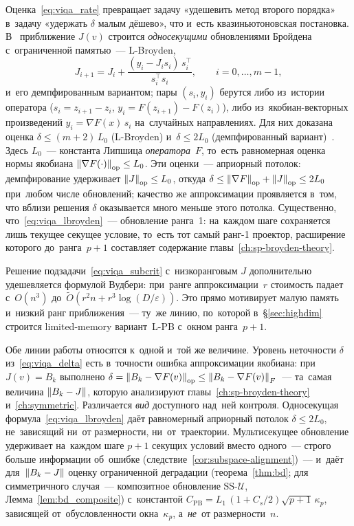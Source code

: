Оценка~\eqref{eq:viqa_rate} превращает задачу «удешевить метод второго
порядка» в~задачу «удержать $\delta$ малым дёшево», что и~есть
квазиньютоновская постановка. В~\cite{viqa2024} приближение $J(v)$
строится \emph{односекущими} обновлениями Бройдена с~ограниченной
памятью~--- L-Broyden,
\begin{equation}\label{eq:viqa_lbroyden}
  J_{i+1} = J_i + \frac{(y_i - J_i s_i)\,s_i^\top}{s_i^\top s_i},
  \qquad i = 0,\dots,m-1,
\end{equation}
и~его демпфированным вариантом; пары $(s_i,y_i)$ берутся либо из~истории
оператора ($s_i=z_{i+1}-z_i$, $y_i=F(z_{i+1})-F(z_i)$), либо из~якобиан-векторных
произведений $y_i=\nabla F(x)\,s_i$ на~случайных направлениях. Для них
доказана оценка $\delta\le(m{+}2)\,L_0$ (L-Broyden) и~$\delta\le 2L_0$
(демпфированный вариант)~\cite{viqa2024}. Здесь $L_0$~--- константа Липшица
\emph{оператора}~$F$, то~есть равномерная оценка нормы якобиана
$\left\|\nabla F(\cdot)\right\|_{\mathrm{op}}\le L_0$. Эти
оценки~--- априорный потолок: демпфирование удерживает
$\left\|J\right\|_{\mathrm{op}}\le L_0$, откуда
$\delta\le\left\|\nabla F\right\|_{\mathrm{op}}+\left\|J\right\|_{\mathrm{op}}\le 2L_0$
при~любом числе обновлений; качество же аппроксимации проявляется в~том,
что вблизи решения $\delta$ оказывается много меньше этого потолка. Существенно, что~\eqref{eq:viqa_lbroyden}~---
обновление ранга~1: на~каждом шаге сохраняется лишь текущее секущее
условие, то~есть тот самый ранг-1 проектор, расширение которого
до~ранга~$p{+}1$ составляет содержание главы~\ref{ch:sp-broyden-theory}.

Решение подзадачи~\eqref{eq:viqa_subcrit} с~низкоранговым $J$ дополнительно
удешевляется формулой Вудбери: при~ранге аппроксимации~$r$ стоимость
падает с~$O(n^3)$ до~$\widetilde{O}(r^2 n + r^3\log(D/\varepsilon))$. Это
прямо мотивирует малую память и~низкий ранг приближения~--- ту~же линию,
по~которой в~\S\ref{sec:highdim} строится limited-memory вариант~L-PB
с~окном ранга~$p{+}1$.

Обе линии работы относятся к~одной и~той же величине. Уровень неточности
$\delta$ из~\eqref{eq:viqa_delta} есть в~точности ошибка аппроксимации
якобиана: при~$J(v)=B_k$ выполнено
$\delta=\left\|B_k-\nabla F(v)\right\|_{\mathrm{op}}\le\left\|B_k-\nabla F(v)\right\|_F$~---
та~самая величина $\left\|B_k-J\right\|$, которую анализируют
главы~\ref{ch:sp-broyden-theory} и~\ref{ch:symmetric}. Различается \emph{вид}
доступного над~ней контроля. Односекущая формула~\eqref{eq:viqa_lbroyden}
даёт равномерный априорный потолок $\delta\le 2L_0$, не~зависящий ни~от
размерности, ни~от~траектории. Мультисекущее обновление удерживает
на~каждом шаге $p{+}1$ секущих условий вместо одного~--- строго больше
информации об~ошибке (следствие~\ref{cor:subspace-alignment})~--- и~даёт
для~$\left\|B_k-J\right\|$ оценку ограниченной деградации (теорема~\ref{thm:bd}; для
симметричного случая~--- композитное обновление SS-$\mathcal{U}$,
Лемма~\ref{lem:bd_composite}) с~константой
$C_{\mathrm{PB}} = L_1\,(1{+}C_s/2)\sqrt{p+1}\,\kappa_p$, зависящей
от~обусловленности окна~$\kappa_p$, а~\emph{не}~от размерности~$n$.

